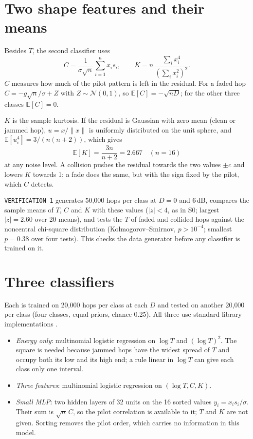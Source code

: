 \documentclass[11pt,a4paper]{article}
\begin{document}
\section{Two shape features and their means}

Besides $T$, the second classifier uses
\begin{equation}
  C = \frac{1}{\sigma\sqrt n}\sum_{i=1}^n x_i s_i, \qquad
  K = n\,\frac{\sum_i x_i^4}{\left(\sum_i x_i^2\right)^2}.
\end{equation}
$C$ measures how much of the pilot pattern is left in the residual. For a faded
hop $C = -g\sqrt n/\sigma + Z$ with $Z \sim \mathcal N(0,1)$, so
$\mathbb E[C] = -\sqrt{nD}$; for the other three classes $\mathbb E[C] = 0$.

$K$ is the sample kurtosis. If the residual is Gaussian with zero mean (clean
or jammed hop), $u = x/\lVert x\rVert$ is uniformly distributed on the unit
sphere, and $\mathbb E[u_i^4] = 3/(n(n+2))$, which gives
\begin{equation}
  \mathbb E[K] = \frac{3n}{n+2} = 2.667 \quad (n = 16)
\end{equation}
at any noise level. A collision pushes the residual towards the two values
$\pm c$ and lowers $K$ towards 1; a fade does the same, but with the sign fixed
by the pilot, which $C$ detects.

\texttt{VERIFICATION 1} generates 50{,}000 hops per class at $D = 0$ and
6\,dB, compares the sample means of $T$, $C$ and $K$ with these values
($|z| < 4$, as in S0; largest $|z| = 2.60$ over 20 means), and tests the $T$
of faded and collided hops against the noncentral chi-square distribution
(Kolmogorov--Smirnov, $p > 10^{-4}$; smallest $p = 0.38$ over four tests).
This checks the data generator before any classifier is trained on it.

\section{Three classifiers}

Each is trained on 20{,}000 hops per class at each $D$ and tested on another
20{,}000 per class (four classes, equal priors, chance 0.25). All three use
standard library implementations \cite{sklearn}.
\begin{itemize}[nosep]
  \item \emph{Energy only}: multinomial logistic regression on $\log T$ and
        $(\log T)^2$. The square is needed because jammed hops have the widest
        spread of $T$ and occupy both its low and its high end; a rule linear
        in $\log T$ can give each class only one interval.
  \item \emph{Three features}: multinomial logistic regression on
        $(\log T, C, K)$.
  \item \emph{Small MLP}: two hidden layers of 32 units on the 16 sorted values
        $y_i = x_i s_i / \sigma$. Their sum is $\sqrt n\, C$, so the pilot
        correlation is available to it; $T$ and $K$ are not given. Sorting
        removes the pilot order, which carries no information in this model.
\end{itemize}
\end{document}
